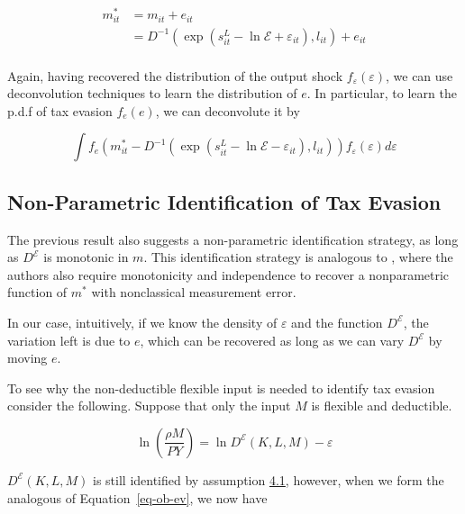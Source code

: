 \documentclass[
  12pt]{article}
\theoremstyle{definition}
\theoremstyle{remark}
\begin{document}
\[
\begin{aligned}
    m^*_{it}&=m_{it}+e_{it}\\
    &=D^{-1}(\exp(s^L_{it}-\ln\mathcal{E}+\varepsilon_{it}),l_{it})+e_{it}\\
\end{aligned}
\]

Again, having recovered the distribution of the output shock
\(f_{\varepsilon}(\varepsilon)\), we can use deconvolution techniques to
learn the distribution of \(e\). In particular, to learn the p.d.f of
tax evasion \(f_e(e)\), we can deconvolute it by

\[
    \int f_e(m^*_{it}-D^{-1}(\exp(s^L_{it}-\ln\mathcal{E}-\varepsilon_{it}),l_{it})) f_{\varepsilon}(\varepsilon)d\varepsilon
\]

\subsection{Non-Parametric Identification of Tax
Evasion}\label{non-parametric-identification-of-tax-evasion}

The previous result also suggests a non-parametric identification
strategy, as long as \(D^{\mathcal{E}}\) is monotonic in \(m\). This
identification strategy is analogous to \citet{Hu2022b}, where the
authors also require monotonicity and independence to recover a
nonparametric function of \(m^*\) with nonclassical measurement error.

In our case, intuitively, if we know the density of \(\varepsilon\) and
the function \(D^{\mathcal{E}}\), the variation left is due to \(e\),
which can be recovered as long as we can vary \(D^{\mathcal{E}}\) by
moving \(e\).

To see why the non-deductible flexible input is needed to identify tax
evasion consider the following. Suppose that only the input \(M\) is
flexible and deductible.

\[
\ln\left(\frac{\rho M}{PY}\right)=\ln D^{\mathcal{E}}(K,L,M)-\varepsilon
\]

\(D^{\mathcal{E}}(K,L,M)\) is still identified by assumption
\hyperref[ass-non-ev]{4.1}, however, when we form the analogous of
Equation~\ref{eq-ob-ev}, we now have
\end{document}
